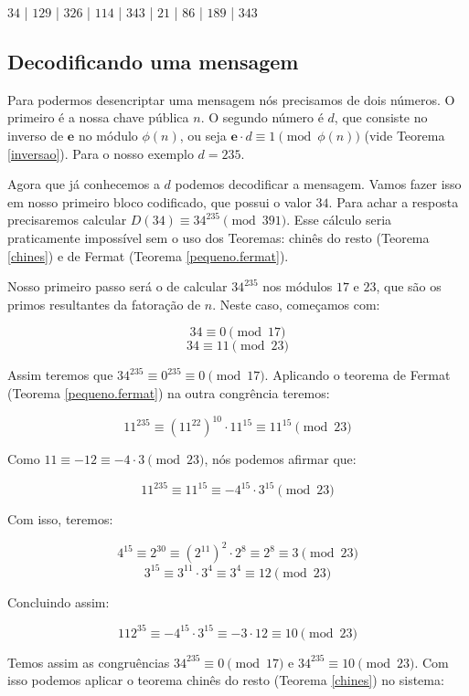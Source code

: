 \begin{center}
	 $34$ | $129$ | $326$ | $114$ | $343$ | $21$ | $86$ | $189$ | $343$
\end{center}

\subsection{Decodificando uma mensagem}

Para podermos desencriptar uma mensagem n\'os precisamos de dois n\'umeros. O primeiro \'e a nossa chave p\'ublica $n$. O segundo n\'umero \'e $d$, que consiste no inverso de $\textbf{e}$ no m\'odulo $\phi(n)$, ou seja $\textbf{e} \cdot d \equiv 1 \pmod{\phi(n)}$ (vide Teorema \ref{inversao}). Para o nosso exemplo $d= 235$.

Agora que j\'a conhecemos a $d$ podemos decodificar a mensagem. Vamos fazer isso em nosso primeiro bloco codificado, que possui o valor $34$. Para achar a resposta precisaremos calcular $D(34) \equiv 34^{235} \pmod{391}$. Esse c\'alculo seria praticamente imposs\'ivel sem o uso dos Teoremas: chin\^es do resto (Teorema \ref{chines}) e de Fermat (Teorema \ref{pequeno.fermat}).

Nosso primeiro passo ser\'a o de calcular $34^{235}$ nos m\'odulos $17$ e $23$, que s\~ao os primos resultantes da fatora\c{c}\~ao de $n$. Neste caso, come\c{c}amos com:

$$34 \equiv 0 \pmod{17}$$
$$34 \equiv 11 \pmod{23}$$

Assim teremos que $34^{235} \equiv 0^{235} \equiv 0 \pmod{17}$. Aplicando o teorema de Fermat (Teorema \ref{pequeno.fermat}) na outra congr\^encia teremos:

$$11^{235} \equiv (11^{22})^{10} \cdot 11^{15} \equiv 11^{15} \pmod{23}$$

Como $ 11 \equiv -12 \equiv -4 \cdot 3 \pmod{23}$, n\'os podemos afirmar que:

$$11^{235} \equiv 11^{15} \equiv -4^{15} \cdot 3^{15}\pmod{23}$$

Com isso, teremos:

$$4^{15} \equiv 2^{30} \equiv (2^{11})^2 \cdot 2^8 \equiv 2^8 \equiv 3 \pmod{23}$$
$$3^{15} \equiv 3^{11} \cdot 3^4 \equiv 3^4 \equiv 12 \pmod{23}$$

Concluindo assim:

$$112^{35} \equiv -4^{15} \cdot 3^{15} \equiv -3 \cdot 12 \equiv 10 \pmod{23}$$

Temos assim as congru\^encias $34^{235} \equiv 0 \pmod{17}$ e $34^{235} \equiv 10 \pmod{23}$. Com isso podemos aplicar o teorema chin\^es do resto (Teorema \ref{chines}) no sistema:

